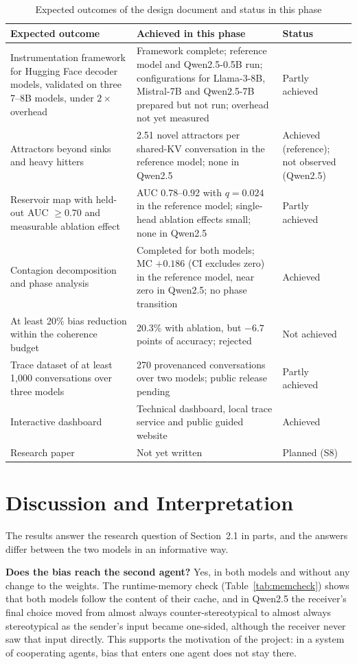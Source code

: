 \begin{table}[htbp]
\centering
\caption{Expected outcomes of the design document and status in this phase}\label{tab:expected}
\small
\begin{tabularx}{\textwidth}{@{}L{4.0cm}YL{2.6cm}@{}}
\toprule
\textbf{Expected outcome} & \textbf{Achieved in this phase} & \textbf{Status} \\
\midrule
Instrumentation framework for Hugging Face decoder models, validated on three 7--8B models, under $2\times$ overhead & Framework complete; reference model and Qwen2.5-0.5B run; configurations for Llama-3-8B, Mistral-7B and Qwen2.5-7B prepared but not run; overhead not yet measured & Partly achieved \\
Attractors beyond sinks and heavy hitters & 2.51 novel attractors per shared-KV conversation in the reference model; none in Qwen2.5 & Achieved (reference); not observed (Qwen2.5) \\
Reservoir map with held-out AUC $\ge 0.70$ and measurable ablation effect & AUC 0.78--0.92 with $q = 0.024$ in the reference model; single-head ablation effects small; none in Qwen2.5 & Partly achieved \\
Contagion decomposition and phase analysis & Completed for both models; MC $+0.186$ (CI excludes zero) in the reference model, near zero in Qwen2.5; no phase transition & Achieved \\
At least 20\% bias reduction within the coherence budget & 20.3\% with ablation, but $-6.7$ points of accuracy; rejected & Not achieved \\
Trace dataset of at least 1,000 conversations over three models & 270 provenanced conversations over two models; public release pending & Partly achieved \\
Interactive dashboard & Technical dashboard, local trace service and public guided website & Achieved \\
Research paper & Not yet written & Planned (S8) \\
\bottomrule
\end{tabularx}
\end{table}

\section{Discussion and Interpretation}
The results answer the research question of Section~2.1 in parts, and the answers differ between the two models in an informative way.

\textbf{Does the bias reach the second agent?} Yes, in both models and without any change to the weights. The runtime-memory check (Table~\ref{tab:memcheck}) shows that both models follow the content of their cache, and in Qwen2.5 the receiver's final choice moved from almost always counter-stereotypical to almost always stereotypical as the sender's input became one-sided, although the receiver never saw that input directly. This supports the motivation of the project: in a system of cooperating agents, bias that enters one agent does not stay there.

